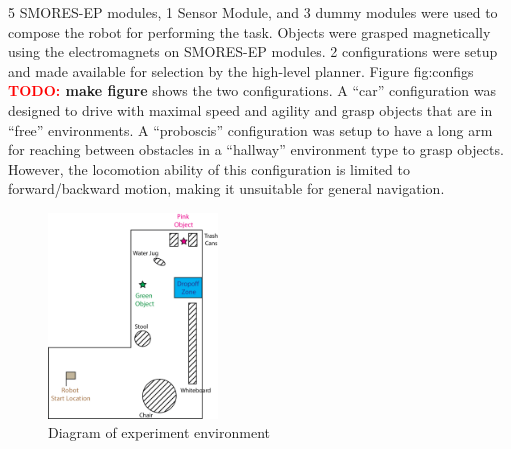 \documentclass[conference]{IEEEtran}
\newcommand{\TODO}[1]{ {\bf \textcolor{red}{TODO:} #1 }}
\begin{document}
5 SMORES-EP modules, 1 Sensor Module, and 3 dummy modules were used to compose the robot for performing the task. Objects were grasped magnetically using the electromagnets on SMORES-EP modules. 2 configurations were setup and made available for selection by the high-level planner. Figure {fig:configs} \TODO{make figure}shows the two configurations. A ``car'' configuration was designed to drive with maximal speed and agility and grasp objects that are in ``free'' environments. A ``proboscis'' configuration was setup to have a long arm for reaching between obstacles in a ``hallway'' environment type to grasp objects. However, the locomotion ability of this configuration is limited to forward/backward motion, making it unsuitable for general navigation.

\begin{figure}
\begin{center}
\includegraphics[width=0.4\textwidth]{images/RSSMap.png}
\caption{Diagram of experiment environment}
\label{fig:map}
\end{center}
\end{figure}
\end{document}
